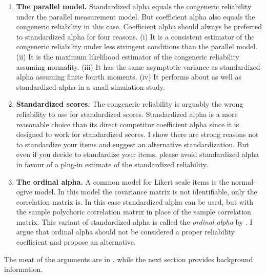 \documentclass[twoside]{article}
\begin{document}
\begin{enumerate}[label=(\Alph*)]

\item \textbf{The parallel model.} Standardized alpha equals the congeneric reliability under the parallel measurement model. But coefficient alpha also equals the congeneric reliability in this case. Coefficient alpha should always be preferred to standardized alpha for four reasons. (i) It is a consistent estimator of the congeneric reliability under less stringent conditions than the parallel model. (ii) It is the maximum likelihood estimator of the congeneric reliability assuming normality. (iii) It has the same asymptotic variance as standardized alpha assuming finite fourth moments. (iv) It performs about as well as standardized alpha in a small simulation study.
\item \textbf{Standardized scores.} The congeneric reliability is arguably the wrong reliability to use for standardized scores. Standardized alpha is a more reasonable choice than its direct competitor coefficient alpha since it is designed to work for standardized scores. I show there are strong reasons not to standardize your items and suggest an alternative standardization. But even if you decide to standardize your items, please avoid standardized alpha in favour of a plug-in estimate of the standardized reliability.
\item \textbf{The ordinal alpha.} A common model for Likert scale items is the normal-ogive model. In this model the covariance matrix is not identifiable, only the correlation matrix is. In this case standardized alpha can be used, but with the sample polychoric correlation matrix in place of the sample correlation matrix. This variant of standardized alpha is called the \textit{ordinal alpha} by \citet{Zumbo2007-ap}. I argue that ordinal alpha should not be considered a proper reliability coefficient and propose an alternative.
\end{enumerate}

The meat of the arguments are in , while the next section provides background information.

\end{document}
